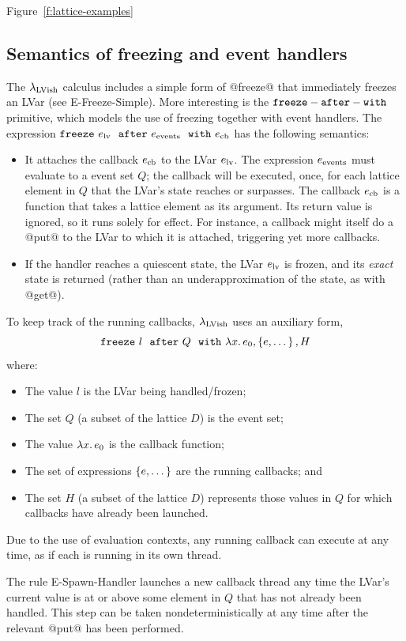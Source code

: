 \documentclass{article}
\begin{document}
Figure~\ref{f:lattice-examples}

\subsection{Semantics of freezing and event handlers}

The $\lambda_{\textrm{LVish}}$ calculus includes a simple form of @freeze@ that
immediately freezes an LVar (see {\sc E-Freeze-Simple}).  More
interesting is the ${\mbox{\texttt{freeze}}-\mbox{\texttt{after}}-\mbox{\texttt{with}}}$ primitive, which models the use of freezing
together with event handlers.  The expression $\mbox{\texttt{freeze}}~e_{\rm
    lv}~~{\mbox{\texttt{after}}}~e_{\rm events}~~{\mbox{\texttt{with}}}~e_{\rm cb}$ has the following semantics:
\begin{itemize}
\item It attaches the callback $e_{\rm cb}$ to the LVar $e_{\rm lv}$.
  The expression $e_{\rm events}$ must evaluate to a event set $Q$;
  the callback will be executed, once, for each lattice element in $Q$
  that the LVar's state reaches or surpasses.  The callback $e_{\rm
    cb}$ is a function that takes a lattice element as its argument.
  Its return value is ignored, so it runs solely for effect.  For
  instance, a callback might itself do a @put@ to the LVar to which it
  is attached, triggering yet more callbacks.
\item If the handler reaches a quiescent state, the LVar $e_{\rm lv}$
  is frozen, and its \emph{exact} state is returned (rather than an
  underapproximation of the state, as with @get@).
\end{itemize}
\noindent
To keep track of the running callbacks, $\lambda_{\textrm{LVish}}$ uses an
auxiliary form,
\[
   \mbox{\texttt{freeze}}~l~~{\mbox{\texttt{after}}}~Q~~{\mbox{\texttt{with}}}~\lambda x.\,e_0, \left\{e, \dots\right\}, H
\]
where:
\begin{itemize}
\item The value $l$ is the LVar being handled/frozen;
\item The set $Q$ (a subset of the lattice $D$) is the event set;
\item The value $\lambda x.\,e_0$ is the callback function;
\item The set of expressions $\left\{e, \dots\right\}$ are the running callbacks; and
\item The set $H$ (a subset of the lattice $D$) represents those values in $Q$
  for which callbacks have already been launched.
\end{itemize}
Due to the use of evaluation contexts, any running callback can
execute at any time, as if each is running in its own thread.

The rule {\sc E-Spawn-Handler} launches a new callback thread any time
the LVar's current value is at or above some element in $Q$ that has
not already been handled.  This step can be taken nondeterministically
at any time after the relevant @put@ has been performed.
\end{document}
